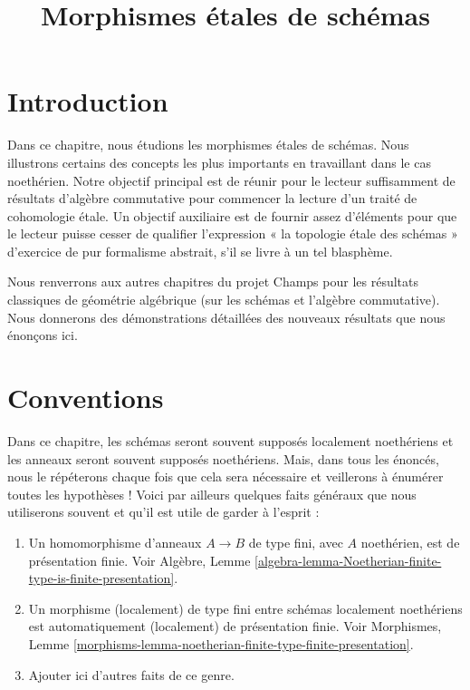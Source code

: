 

%


\title{Morphismes \'etales de schémas}

\maketitle

\label{section-phantom}

\tableofcontents



\section{Introduction}
\label{section-introduction}

\noindent
Dans ce chapitre, nous étudions les morphismes \'etales de schémas. Nous illustrons
certains des concepts les plus importants en travaillant dans le cas noethérien.
Notre objectif principal est de réunir pour le lecteur suffisamment de résultats
d'algèbre commutative pour commencer la lecture d'un traité de cohomologie \'etale. Un
objectif auxiliaire est de fournir assez d'éléments pour que le lecteur puisse
cesser de qualifier l'expression « la topologie \'etale des schémas »
d'exercice de pur formalisme abstrait, s'il se livre à un tel blasphème.

\medskip\noindent
Nous renverrons aux autres
chapitres du projet Champs pour les résultats classiques de géométrie algébrique
(sur les schémas et l'algèbre commutative). Nous donnerons des démonstrations
détaillées des nouveaux résultats que nous énonçons ici.




\section{Conventions}
\label{section-conventions}

\noindent
Dans ce chapitre, les schémas seront souvent supposés localement noethériens
et les anneaux seront souvent supposés noethériens. Mais, dans tous les énoncés,
nous le répéterons chaque fois que cela sera nécessaire et veillerons à énumérer
toutes les hypothèses ! Voici par ailleurs quelques faits généraux que nous utiliserons
souvent et qu'il est utile de garder à l'esprit :
\begin{enumerate}
\item Un homomorphisme d'anneaux $A \to B$ de type fini, avec $A$ noethérien,
est de présentation finie. Voir Algèbre,
Lemme \ref{algebra-lemma-Noetherian-finite-type-is-finite-presentation}.
\item Un morphisme (localement) de type fini entre schémas localement noethériens
est automatiquement (localement) de présentation finie.
Voir Morphismes,
Lemme \ref{morphisms-lemma-noetherian-finite-type-finite-presentation}.
\item Ajouter ici d'autres faits de ce genre.
\end{enumerate}




